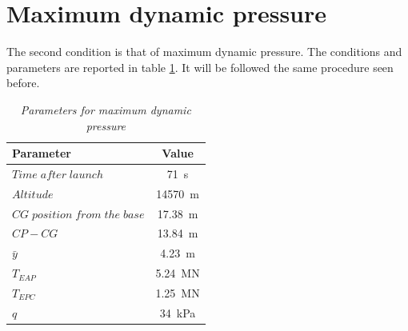 \documentclass[12pt,fleqn,openany]{book} %
\begin{document}
\section{Maximum dynamic pressure}
 The second condition is that of maximum dynamic pressure. The conditions and parameters are reported in table \hypertarget{tab:maxq}{\ref{tab:maxq}}. It will be followed the same procedure seen before.
\begin{table}[h]
	\centering
	\begin{tabular}{ l c }
\toprule
Parameter					&Value 				\\
\midrule                                                                                                             
$Time\; after\; launch$			&\SI{71}{s}			\\
$Altitude$					&\SI{14570}{m}      \\
$CG\; position\; from\; the\; base$	&\SI{17.38}{m}    \\
$CP-CG $				&\SI{13.84}{m}    \\
$\bar{y}$ 					&\SI{4.23}{m}      \\
$T_{EAP}$						&\SI{5.24}{MN}     \\
$T_{EPC}$						&\SI{1.25}{MN}    \\
$q$							&\SI{34}{kPa}    \\
\bottomrule
\end{tabular} 
\caption{\emph{Parameters for maximum dynamic pressure}}        
\label{tab:maxq}                       
\end{table}
\end{document}
